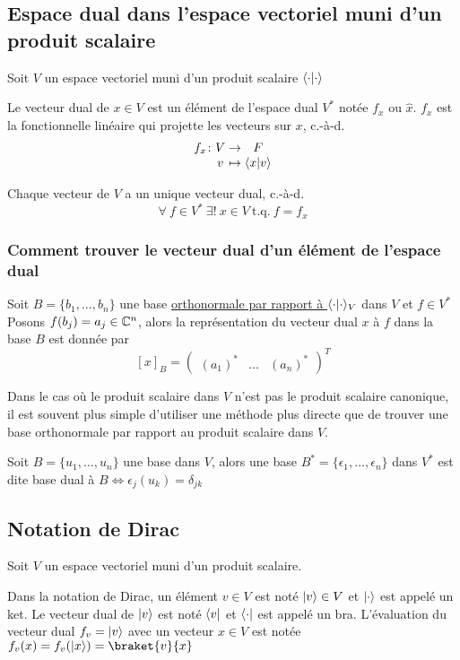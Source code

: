 \subsection{Espace dual dans l'espace vectoriel muni d'un produit scalaire}
Soit $V$ un espace vectoriel muni d'un produit scalaire $\langle \cdot \lvert \cdot \rangle$
\begin{definition}
    Le vecteur dual de $x \in V$ est un élément de l'espace dual $V^*$ notée $f_x$ ou $\hat{x}$. $f_x$ est la fonctionnelle linéaire qui projette les vecteurs sur $x$, c.-à-d.
    \[ \myfunc{f_x}{V}{F}{v}{\scpr{x}{v}} \]
\end{definition}
\begin{theorem} Chaque vecteur de $V$ a un unique vecteur dual, c.-à-d.
    \[\forall \ f \in V^* \ \exists! \ x \in V \ \text{t.q.} \ f = f_x\]
\end{theorem}
\subsubsection{Comment trouver le vecteur dual d'un élément de l'espace dual}
Soit $B = \{b_1, \dots, b_n\}$ une base \underline{orthonormale par rapport à $\langle \cdot \lvert \cdot \rangle_V$} dans $V$ et $f \in V^*$ \\
Posons $f(b_j) = a_j \in \mathbb{C}^n$, alors la représentation du vecteur dual $x$ à $f$ dans la base $B$ est donnée par 
\[
[x]_B = \begin{pmatrix} (a_1)^* & \dots & (a_n)^* \end{pmatrix}^T 
\]
\begin{note}
    Dans le cas où le produit scalaire
    dans $V$ n'est pas le produit scalaire canonique, il est souvent plus simple d'utiliser une 
    méthode plus directe que de trouver une base orthonormale par rapport au produit scalaire dans $V$.
\end{note}
\begin{definition}
    Soit $B = \{u_1, \dots, u_n\}$ une base dans $V$, alors 
    une base $B^* = \{\epsilon_1, \dots, \epsilon_n\}$ dans $V^*$ est dite base dual à 
    $B \iff \epsilon_j(u_k) = \delta_{jk}$ 
\end{definition}
\subsection{Notation de Dirac}
Soit $V$ un espace vectoriel muni d'un produit scalaire.
\begin{definition}
    Dans la notation de Dirac, un élément $v \in V$ est noté $\lvert v\rangle \in V$ et $\lvert\cdot\rangle$ est appelé un ket. 
    Le vecteur dual de $\lvert v\rangle$ est noté $\langle v\rvert$ et $\langle\cdot\rvert$ est appelé un bra. L'évaluation
    du vecteur dual $f_v = \lvert v\rangle$ avec un vecteur $x \in V$ est notée $f_v(x) = f_v(\ket{x}) = \braket{v}{x}$
\end{definition}